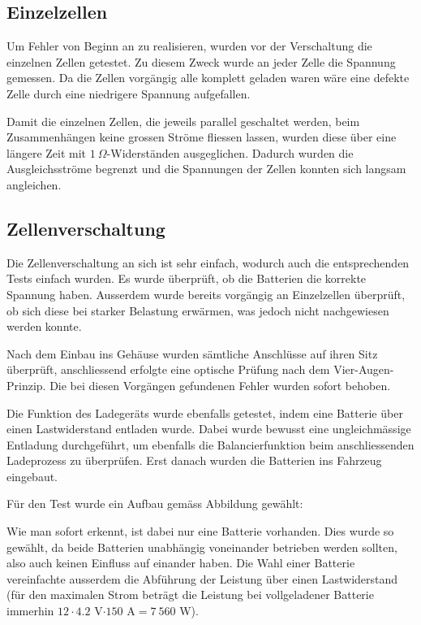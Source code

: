 \subsection{Einzelzellen}
Um Fehler von Beginn an zu realisieren, wurden vor der Verschaltung die einzelnen Zellen getestet. Zu diesem Zweck wurde an jeder Zelle die Spannung gemessen. Da die Zellen vorgängig alle komplett geladen waren wäre eine defekte Zelle durch eine niedrigere Spannung aufgefallen.

Damit die einzelnen Zellen, die jeweils parallel geschaltet werden, beim Zusammenhängen keine grossen Ströme fliessen lassen, wurden diese über eine längere Zeit mit $1\ \Omega$-Widerständen ausgeglichen. Dadurch wurden die Ausgleichsströme begrenzt und die Spannungen der Zellen konnten sich langsam angleichen.

\subsection{Zellenverschaltung}
Die Zellenverschaltung an sich ist sehr einfach, wodurch auch die entsprechenden Tests einfach wurden. Es wurde überprüft, ob die Batterien die korrekte Spannung haben. Ausserdem wurde bereits vorgängig an Einzelzellen überprüft, ob sich diese bei starker Belastung erwärmen, was jedoch nicht nachgewiesen werden konnte.

Nach dem Einbau ins Gehäuse wurden sämtliche Anschlüsse auf ihren Sitz überprüft, anschliessend erfolgte eine optische Prüfung nach dem Vier-Augen-Prinzip. Die bei diesen Vorgängen gefundenen Fehler wurden sofort behoben.

Die Funktion des Ladegeräts wurde ebenfalls getestet, indem eine Batterie über einen Lastwiderstand entladen wurde. Dabei wurde bewusst eine ungleichmässige Entladung durchgeführt, um ebenfalls die Balancierfunktion beim anschliessenden Ladeprozess zu überprüfen. Erst danach wurden die Batterien ins Fahrzeug eingebaut.

\color{blue}Für den Test wurde ein Aufbau gemäss Abbildung  gewählt:

Wie man sofort erkennt, ist dabei nur eine Batterie vorhanden. Dies wurde so gewählt, da beide Batterien unabhängig voneinander betrieben werden sollten, also auch keinen Einfluss auf einander haben. Die Wahl einer Batterie vereinfachte ausserdem die Abführung der Leistung über einen Lastwiderstand (für den maximalen Strom beträgt die Leistung bei vollgeladener Batterie immerhin $12\cdot4.2$ V$\cdot 150$ A$=7\ 560$ W).

